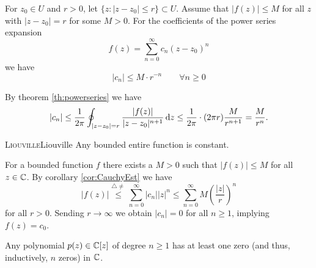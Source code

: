 \documentclass[a4paper,english]{article}
\begin{document}
\begin{cor} \label{cor:cauchyestimate} \label{cor:CauchyEst}
    For $z_0 \in U$ and $r > 0$, let $\{ z: | z - z_0 | \le r \} \subset U$.
    Assume that $| f(z) | \le M$ for all $z$ with $| z - z_0 | = r$ for some $M > 0$.
    For the coefficients of the power series expansion
    \begin{equation*}
        f(z)
        = \sum_{n = 0}^{\infty} c_n (z - z_0)^n
    \end{equation*}
    we have
    \begin{equation*}
        | c_n |
        \le M \cdot r^{-n}
        \qquad \forall n \ge 0
    \end{equation*}
\end{cor}

\begin{pr}
    By theorem \ref{th:powerseries} we have
    \begin{equation*}
        | c_n |
        \le \frac{1}{2 \pi} \oint_{|z - z_0 | = r} \frac{| f(z) |}{|z - z_0|^{n + 1}} \mathop{}\!\mathrm{d}{z}
        \le \frac{1}{2 \pi} \cdot (2 \pi r) \frac{M}{r^{n + 1}} 
        = \frac{M}{r^{n}}.
    \end{equation*}
\end{pr}    


\begin{thm}{\textsc{Liouville}}{Liouville}
    Any bounded entire function is constant.
\end{thm}

\begin{pr}
    For a bounded function $f$ there exists a $M > 0$ such that $| f(z) | \le M$ for all $z \in \operatorname{\mathbb{C}}$.
    By corollary \ref{cor:CauchyEst} we have
    \begin{equation*}
        | f(z) |
        \overset{\triangle \ne}{\le} \sum_{n = 0}^{\infty} | c_n | | z |^n
        \le \sum_{n = 0}^{\infty} M \left(\frac{| z |}{r}\right)^n
    \end{equation*}
    for all $r > 0$.
    Sending $r \to \infty$ we obtain $| c_n | = 0$ for all $n \ge 1$, implying $f(z) = c_0$.
\end{pr}

\begin{cor}
    Any polynomial $p(z) \in \operatorname{\mathbb{C}}[z]$ of degree $n \ge 1$ has at least one zero (and thus, inductively, $n$ zeros) in $\operatorname{\mathbb{C}}$.
\end{cor}
\end{document}

